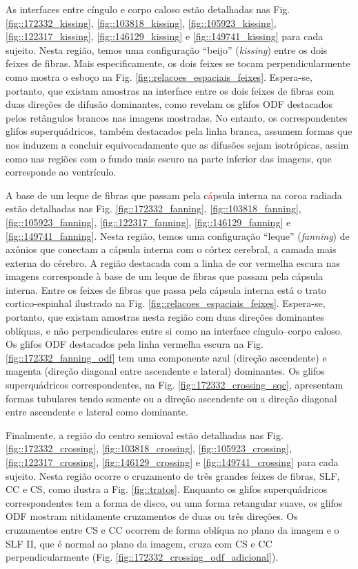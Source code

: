 As interfaces entre cíngulo e corpo caloso estão detalhadas nas Fig. \ref{fig::172332_kissing},
\ref{fig::103818_kissing},
\ref{fig::105923_kissing},
\ref{fig::122317_kissing},
\ref{fig::146129_kissing} e
\ref{fig::149741_kissing} para cada sujeito. Nesta região, temos uma configuração ``beijo'' (\textit{kissing}) entre os dois feixes de fibras. Mais especificamente, os dois feixes se tocam perpendicularmente como mostra o esboço na Fig. \ref{fig::relacoes_espaciais_feixes}. Espera-se, portanto, que existam amostras na interface entre os dois feixes de fibras com duas direções de difusão dominantes, como revelam os glifos ODF destacados pelos retângulos brancos nas imagens mostradas. No entanto, os correspondentes glifos superquádricos, também destacados pela linha branca, assumem formas que nos induzem a concluir equivocadamente que as difusões sejam isotrópicas, assim como nas regiões com o fundo mais escuro na parte inferior das imagens, que corresponde ao ventrículo.

A base de um leque de fibras que passam pela c\textcolor{red}{á}psula interna na coroa radiada estão detalhadas nas Fig.
\ref{fig::172332_fanning},
\ref{fig::103818_fanning},
\ref{fig::105923_fanning},
\ref{fig::122317_fanning},
\ref{fig::146129_fanning} e
\ref{fig::149741_fanning}. Nesta região, temos uma configuração ``leque'' (\textit{fanning}) de axônios que conectam a cápsula interna com o córtex cerebral, a camada mais externa do cérebro. A região destacada com a linha de cor vermelha escura nas imagens corresponde à base de um leque de fibras que passam pela cápsula interna.  Entre os feixes de fibras que passa pela cápsula interna está o trato cortico-espinhal ilustrado na Fig. \ref{fig::relacoes_espaciais_feixes}. Espera-se, portanto, que existam amostras nesta região com duas direções dominantes oblíquas, e não perpendiculares entre si como na interface cíngulo--corpo caloso. Os glifos ODF destacados pela linha vermelha escura na Fig. \ref{fig::172332_fanning_odf} tem uma componente azul (direção ascendente) e magenta (direção diagonal entre ascendente e lateral) dominantes. Os glifos superquádricos correspondentes, na Fig. \ref{fig::172332_crossing_sqc}, apresentam formas tubulares tendo somente ou a direção ascendente ou a direção diagonal entre ascendente e lateral como dominante.

Finalmente, a região do centro semioval estão detalhadas nas Fig.
\ref{fig::172332_crossing},
\ref{fig::103818_crossing},
\ref{fig::105923_crossing},
\ref{fig::122317_crossing},
\ref{fig::146129_crossing} e
\ref{fig::149741_crossing} para cada sujeito. Nesta região ocorre o cruzamento de três grandes feixes de fibras, SLF, CC e CS, como ilustra a Fig. \ref{fig::tratos}. Enquanto os glifos superquádricos correspondentes tem a forma de disco, ou uma forma retangular suave, os glifos ODF mostram nitidamente cruzamentos de duas ou três direções. Os cruzamentos entre CS e CC ocorrem de forma oblíqua no plano da imagem e o SLF II, que é normal ao plano da imagem, cruza com CS e CC perpendicularmente (Fig. \ref{fig::172332_crossing_odf_adicional}).

